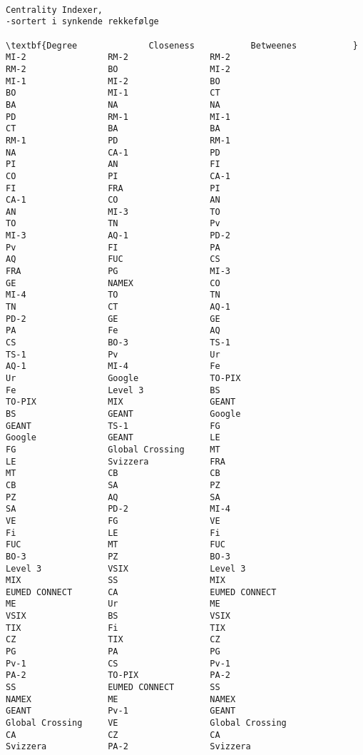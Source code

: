 \documentclass[11pt]{article}
\begin{document}
    \begin{Verbatim}[commandchars=\\\{\}]

Centrality Indexer,
-sortert i synkende rekkefølge

\textbf{Degree              Closeness           Betweenes           }
MI-2                RM-2                RM-2
RM-2                BO                  MI-2
MI-1                MI-2                BO
BO                  MI-1                CT
BA                  NA                  NA
PD                  RM-1                MI-1
CT                  BA                  BA
RM-1                PD                  RM-1
NA                  CA-1                PD
PI                  AN                  FI
CO                  PI                  CA-1
FI                  FRA                 PI
CA-1                CO                  AN
AN                  MI-3                TO
TO                  TN                  Pv
MI-3                AQ-1                PD-2
Pv                  FI                  PA
AQ                  FUC                 CS
FRA                 PG                  MI-3
GE                  NAMEX               CO
MI-4                TO                  TN
TN                  CT                  AQ-1
PD-2                GE                  GE
PA                  Fe                  AQ
CS                  BO-3                TS-1
TS-1                Pv                  Ur
AQ-1                MI-4                Fe
Ur                  Google              TO-PIX
Fe                  Level 3             BS
TO-PIX              MIX                 GEANT
BS                  GEANT               Google
GEANT               TS-1                FG
Google              GEANT               LE
FG                  Global Crossing     MT
LE                  Svizzera            FRA
MT                  CB                  CB
CB                  SA                  PZ
PZ                  AQ                  SA
SA                  PD-2                MI-4
VE                  FG                  VE
Fi                  LE                  Fi
FUC                 MT                  FUC
BO-3                PZ                  BO-3
Level 3             VSIX                Level 3
MIX                 SS                  MIX
EUMED CONNECT       CA                  EUMED CONNECT
ME                  Ur                  ME
VSIX                BS                  VSIX
TIX                 Fi                  TIX
CZ                  TIX                 CZ
PG                  PA                  PG
Pv-1                CS                  Pv-1
PA-2                TO-PIX              PA-2
SS                  EUMED CONNECT       SS
NAMEX               ME                  NAMEX
GEANT               Pv-1                GEANT
Global Crossing     VE                  Global Crossing
CA                  CZ                  CA
Svizzera            PA-2                Svizzera
    \end{Verbatim}
\end{document}
